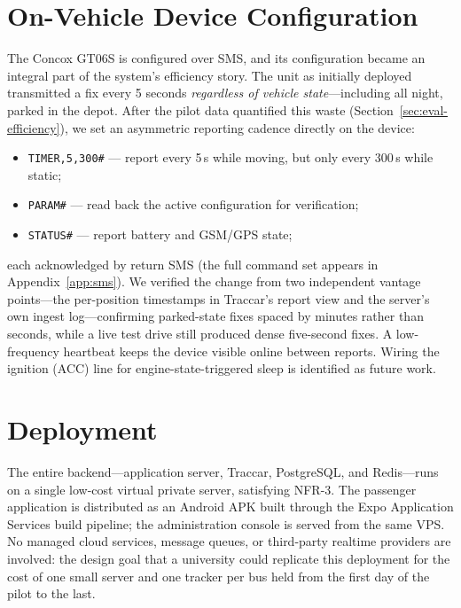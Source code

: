 \section{On-Vehicle Device Configuration}
\label{sec:impl-device}
The Concox GT06S is configured over SMS, and its configuration became an
integral part of the system's efficiency story. The unit as initially
deployed transmitted a fix every 5 seconds \emph{regardless of vehicle
state}---including all night, parked in the depot. After the pilot data
quantified this waste (Section~\ref{sec:eval-efficiency}), we set an
asymmetric reporting cadence directly on the device:

\begin{itemize}
  \item \texttt{TIMER,5,300\#} --- report every 5\,s while moving, but
  only every 300\,s while static;
  \item \texttt{PARAM\#} --- read back the active configuration for
  verification;
  \item \texttt{STATUS\#} --- report battery and GSM/GPS state;
\end{itemize}

each acknowledged by return SMS (the full command set appears in
Appendix~\ref{app:sms}). We verified the change from two independent
vantage points---the per-position timestamps in Traccar's report view
and the server's own ingest log---confirming parked-state fixes spaced
by minutes rather than seconds, while a live test drive still produced
dense five-second fixes. A low-frequency heartbeat keeps the device
visible online between reports. Wiring the ignition (ACC) line for
engine-state-triggered sleep is identified as future work.

\section{Deployment}
\label{sec:impl-deploy}
The entire backend---application server, Traccar, PostgreSQL, and
Redis---runs on a single low-cost virtual private server, satisfying
NFR-3. The passenger application is distributed as an Android APK built
through the Expo Application Services build pipeline; the administration
console is served from the same VPS. No managed cloud services, message
queues, or third-party realtime providers are involved: the design goal
that a university could replicate this deployment for the cost of one
small server and one tracker per bus held from the first day of the
pilot to the last.

